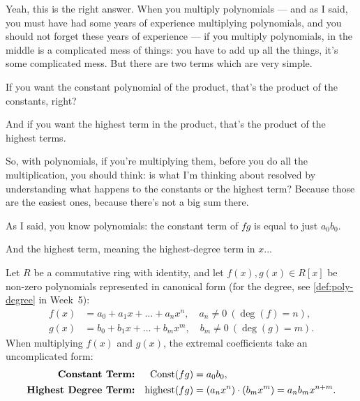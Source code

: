 \begin{speech}[00:20:45 - 00:22:05]
Yeah, this is the right answer. When you multiply polynomials --- and as I said, you must have had some years of experience multiplying polynomials, and you should not forget these years of experience --- if you multiply polynomials, in the middle is a complicated mess of things: you have to add up all the things, it's some complicated mess. But there are two terms which are very simple.

If you want the constant polynomial of the product, that's the product of the constants, right? 

And if you want the highest term in the product, that's the product of the highest terms. 

So, with polynomials, if you're multiplying them, before you do all the multiplication, you should think: is what I'm thinking about resolved by understanding what happens to the constants or the highest term? Because those are the easiest ones, because there's not a big sum there.

As I said, you know polynomials: the constant term of $fg$ is equal to just $a_0 b_0$.

And the highest term, meaning the highest-degree term in $x$...
\end{speech}

\begin{content}
Let $R$ be a commutative ring with identity, and let $f(x), g(x) \in R[x]$ be non-zero polynomials represented in canonical form (for the degree, see \cref{def:poly-degree} in Week~5):
\begin{align}
    f(x) &= a_0 + a_1 x + \dots + a_n x^n, \quad a_n \neq 0 \ (\deg(f) = n), \label{eq:poly-f-rep} \\
    g(x) &= b_0 + b_1 x + \dots + b_m x^m, \quad b_m \neq 0 \ (\deg(g) = m). \label{eq:poly-g-rep}
\end{align}
When multiplying $f(x)$ and $g(x)$, the extremal coefficients take an uncomplicated form:
\begin{align}
    \text{\textbf{Constant Term:}} && \operatorname{Const}(fg) &= a_0 b_0, \label{eq:const-term-fg} \\
    \text{\textbf{Highest Degree Term:}} && \operatorname{highest}(fg) &= (a_n x^n) \cdot (b_m x^m) = a_n b_m x^{n+m}. \label{eq:highest-term-fg}
\end{align}
\end{content}

